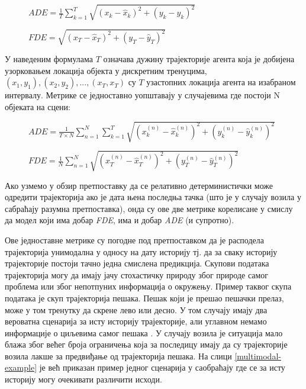 \documentclass[11pt,oneside]{memoir}
\begin{document}
\begin{figure}[H]
  \centering
  $ADE = \frac{1}{T}\sum_{k=1}^{T}\sqrt{(x_k - \hat{x}_k)^2 + (y_k - \hat{y}_k)^2}$
\end{figure}


\begin{figure}[H]
  \centering
  $FDE = \sqrt{(x_{T} - \hat{x}_{T})^2 + (y_{T} - \hat{y}_{T})^2}$
\end{figure}

У наведеним формулама $T$ означава дужину трајекторије агента која је добијена узорковањем локација објекта у дискретним тренуцима, 
$(x_{1}, y_{1}), (x_{2}, y_{2}), ..., (x_{T}, x_{T})$ су $T$ узастопних локација агента на изабраном интервалу. 
Метрике се једноставно уопштавају у случајевима где постоји N објеката на сцени:

\begin{figure}[H]
  \centering
  $ADE = \frac{1}{T\times N}\sum_{n=1}^{N}\sum_{k=1}^{T}\sqrt{(x^{(n)}_k - \hat{x}^{(n)}_k)^2 + (y^{(n)}_k - \hat{y}^{(n)}_k)^2}$
\end{figure}

\begin{figure}[H]
  \centering
  $FDE = \frac{1}{N}\sum_{n=1}^{N}\sqrt{(x^{(n)}_{T} - \hat{x}^{(n)}_{T})^2 + (y^{(n)}_{T} - \hat{y}^{(n)}_{T})^2}$
\end{figure}

Ако узмемо у обзир претпоставку да се релативно детерминистички може одредити трајекторија ако је дата њена последња тачка 
(што је у случају возила у сабраћају разумна претпоставка), онда су ове две метрике корелисане у смислу да модел 
који има добар \textit{FDE}, има и добар \textit{ADE} (и супротно).

Ове једноставне метрике су погодне под претпоставком да је расподела трајекторија унимодална у односу на дату историју тј. да за сваку историју трајекторије 
постоји тачно једна смислена предикција. 
Скупови података трајекторија могу да имају јачу стохастичку природу због природе самог проблема или због непотпуних информација о окружењу.
Пример таквог скупа података је скуп трајекторија пешака. Пешак који је прешао пешачки прелаз, може у том тренутку да скрене лево или десно.
У том случају имају два вероватна сценарија за исту историју трајекторије, али углавном немамо информације о циљевима самог пешака \cite{social_gan, best_of_many_cvae}. 
У случају возила је ситуација мало блажа због већег броја ограничења која за последицу имају да су трајекторије возила
лакше за предвиђање од трајекторија пешака. На слици \ref{multimodal-example} је већ приказан пример једног сценарија у саобраћају где
се за исту историју могу очекивати различити исходи.
\end{document}
